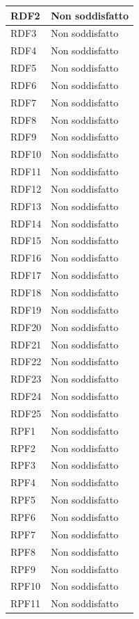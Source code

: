 \begin{longtable}{| p{2.5cm} | p{3cm} |}
	RDF2 & Non soddisfatto \\ \hline
	RDF3 & Non soddisfatto \\ \hline
	RDF4 & Non soddisfatto \\ \hline
	RDF5 & Non soddisfatto \\ \hline
	RDF6 & Non soddisfatto \\ \hline
	RDF7 & Non soddisfatto \\ \hline
	RDF8 & Non soddisfatto \\ \hline
	RDF9 & Non soddisfatto \\ \hline
	RDF10 & Non soddisfatto \\ \hline
	RDF11 & Non soddisfatto \\ \hline
	RDF12 & Non soddisfatto \\ \hline
	RDF13 & Non soddisfatto \\ \hline
	RDF14 & Non soddisfatto \\ \hline
	RDF15 & Non soddisfatto \\ \hline
	RDF16 & Non soddisfatto \\ \hline
	RDF17 & Non soddisfatto \\ \hline
	RDF18 & Non soddisfatto \\ \hline
	RDF19 & Non soddisfatto \\ \hline
	RDF20 & Non soddisfatto \\ \hline
	RDF21 & Non soddisfatto \\ \hline
	RDF22 & Non soddisfatto \\ \hline
	RDF23 & Non soddisfatto \\ \hline
	RDF24 & Non soddisfatto \\ \hline
	RDF25 & Non soddisfatto \\ \hline
	RPF1 & Non soddisfatto \\ \hline
	RPF2 & Non soddisfatto \\ \hline
	RPF3 & Non soddisfatto \\ \hline
	RPF4 & Non soddisfatto \\ \hline
	RPF5 & Non soddisfatto \\ \hline
	RPF6 & Non soddisfatto \\ \hline
	RPF7 & Non soddisfatto \\ \hline
	RPF8 & Non soddisfatto \\ \hline
	RPF9 & Non soddisfatto \\ \hline
	RPF10 & Non soddisfatto \\ \hline
	RPF11 & Non soddisfatto \\ \hline

\end{longtable}
